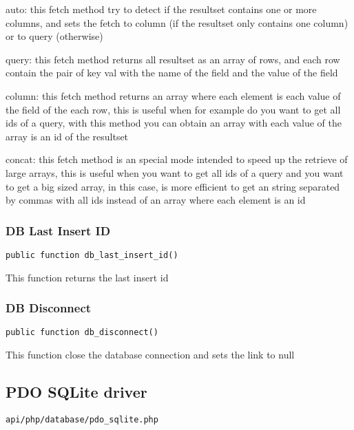 \documentclass[a4paper]{article}
\begin{document}
auto: this fetch method try to detect if the resultset contains one or more columns, and
sets the fetch to column (if the resultset only contains one column) or to query (otherwise)

query: this fetch method returns all resultset as an array of rows, and each row contain the
pair of key val with the name of the field and the value of the field

column: this fetch method returns an array where each element is each value of the field of
the each row, this is useful when for example do you want to get all ids of a query, with
this method you can obtain an array with each value of the array is an id of the resultset

concat: this fetch method is an special mode intended to speed up the retrieve of large
arrays, this is useful when you want to get all ids of a query and you want to get a big
sized array, in this case, is more efficient to get an string separated by commas with all
ids instead of an array where each element is an id

\hypertarget{toc343}{}
\subsubsection{DB Last Insert ID}

\begin{lstlisting}
public function db_last_insert_id()
\end{lstlisting}

This function returns the last insert id

\hypertarget{toc344}{}
\subsubsection{DB Disconnect}

\begin{lstlisting}
public function db_disconnect()
\end{lstlisting}

This function close the database connection and sets the link to null

\hypertarget{toc345}{}
\subsection{PDO SQLite driver}

\begin{lstlisting}
api/php/database/pdo_sqlite.php
\end{lstlisting}
\end{document}

